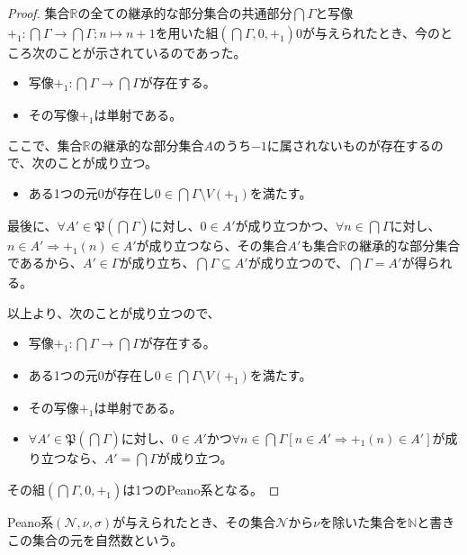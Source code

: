 \documentclass[dvipdfmx]{jsarticle}
\begin{document}
\begin{proof}
集合$\mathbb{R}$の全ての継承的な部分集合の共通部分$\bigcap_{} \varGamma$と写像$+_{1}:\bigcap_{} \varGamma \rightarrow \bigcap_{} \varGamma;n \mapsto n + 1$を用いた組$\left( \bigcap_{} \varGamma,0, +_{1} \right)0$が与えられたとき、今のところ次のことが示されているのであった。
\begin{itemize}
\item
  写像$+_{1}:\bigcap_{} \varGamma \rightarrow \bigcap_{} \varGamma$が存在する。
\item
  その写像$+_{1}$は単射である。
\end{itemize}
ここで、集合$\mathbb{R}$の継承的な部分集合$A$のうち$- 1$に属されないものが存在するので、次のことが成り立つ。
\begin{itemize}
\item
  ある1つの元0が存在し$0 \in \bigcap_{} \varGamma \setminus V\left( +_{1} \right)$を満たす。
\end{itemize}
最後に、$\forall A'\in \mathfrak{P}\left( \bigcap_{} \varGamma \right)$に対し、$0 \in A'$が成り立つかつ、$\forall n \in \bigcap_{} \varGamma$に対し、$n \in A' \Rightarrow +_{1}(n) \in A'$が成り立つなら、その集合$A'$も集合$\mathbb{R}$の継承的な部分集合であるから、$A' \in \varGamma$が成り立ち、$\bigcap_{} \varGamma \subseteq A'$が成り立つので、$\bigcap_{} \varGamma = A'$が得られる。\par
以上より、次のことが成り立つので、
\begin{itemize}
\item
  写像$+_{1}:\bigcap_{} \varGamma \rightarrow \bigcap_{} \varGamma$が存在する。
\item
  ある1つの元0が存在し$0 \in \bigcap_{} \varGamma \setminus V\left( +_{1} \right)$を満たす。
\item
  その写像$+_{1}$は単射である。
\item
  $\forall A'\in \mathfrak{P}\left( \bigcap_{} \varGamma \right)$に対し、$0 \in A'$かつ$\forall n \in \bigcap_{} \varGamma\left[ n \in A' \Rightarrow +_{1}(n) \in A' \right]$が成り立つなら、$A' = \bigcap_{} \varGamma$が成り立つ。
\end{itemize}
その組$\left( \bigcap_{} \varGamma,0, +_{1} \right)$は1つのPeano系となる。
\end{proof}
\begin{dfn}
Peano系$\left( \mathcal{N,}\nu,\sigma \right)$が与えられたとき、その集合$\mathcal{N}$から$\nu$を除いた集合を$\mathbb{N}$と書きこの集合の元を自然数という。
\end{dfn}\par
\end{document}
